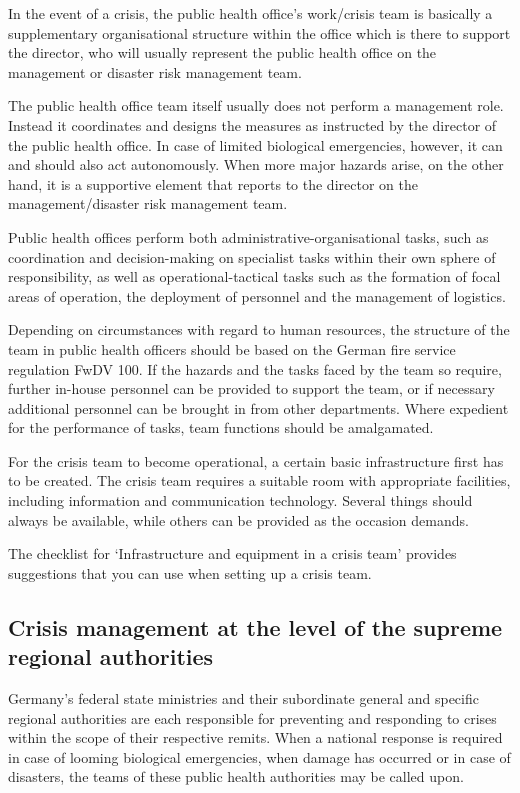 \documentclass{article}
\begin{document}
In the event of a crisis, the public health office's work/crisis team is basically a supplementary organisational structure within the office which is there to support the director, who will usually represent the public health office on the management or disaster risk management team.


The public health office team itself usually does not perform a management role. Instead it coordinates and designs the measures as instructed by the director of the public health office. In case of limited biological emergencies, however, it can and should also act autonomously. When more major hazards arise, on the other hand, it is a supportive element that reports to the director on the management/disaster risk management team.


Public health offices perform both administrative-organisational tasks, such as coordination and decision-making on specialist tasks within their own sphere of responsibility, as well as operational-tactical tasks such as the formation of focal areas of operation, the deployment of personnel and the management of logistics.


Depending on circumstances with regard to human resources, the structure of the team in public health officers should be based on the German fire service regulation FwDV 100. If the hazards and the tasks faced by the team so require, further in-house personnel can be provided to support the team, or if necessary additional personnel can be brought in from other departments. Where expedient for the performance of tasks, team functions should be amalgamated.


For the crisis team to become operational, a certain basic infrastructure first has to be created. The crisis team requires a suitable room with appropriate facilities, including information and communication technology. Several things should always be available, while others can be provided as the occasion demands.


The checklist for ‘Infrastructure and equipment in a crisis team' provides suggestions that you can use when setting up a crisis team.


\subsection{Crisis management at the level of the supreme regional authorities}\label{H6397345}



Germany's federal state ministries and their subordinate general and specific regional authorities are each responsible for preventing and responding to crises within the scope of their respective remits. When a national response is required in case of looming biological emergencies, when damage has occurred or in case of disasters, the teams of these public health authorities may be called upon.
\end{document}
